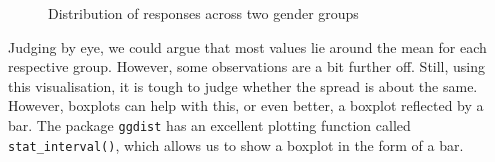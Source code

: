 \documentclass[
  letterpaper,
]{krantz}
\makeatletter
\newenvironment{Shaded}{\begin{snugshade}}{\end{snugshade}}
\newcommand{\AttributeTok}[1]{\textcolor[rgb]{0.40,0.45,0.13}{#1}}
\newcommand{\DecValTok}[1]{\textcolor[rgb]{0.68,0.00,0.00}{#1}}
\newcommand{\FloatTok}[1]{\textcolor[rgb]{0.68,0.00,0.00}{#1}}
\newcommand{\FunctionTok}[1]{\textcolor[rgb]{0.28,0.35,0.67}{#1}}
\newcommand{\NormalTok}[1]{\textcolor[rgb]{0.00,0.23,0.31}{#1}}
\newcommand{\SpecialCharTok}[1]{\textcolor[rgb]{0.37,0.37,0.37}{#1}}
\newcommand{\StringTok}[1]{\textcolor[rgb]{0.13,0.47,0.30}{#1}}
\newenvironment{kframe}{%
\medskip{}
\setlength{\fboxsep}{.8em}
 \def\at@end@of@kframe{}%
 \ifinner\ifhmode%
  \def\at@end@of@kframe{\end{minipage}}%
  \begin{minipage}{\columnwidth}%
 \fi\fi%
 \def\FrameCommand##1{\hskip\@totalleftmargin \hskip-\fboxsep
 \colorbox{shadecolor}{##1}\hskip-\fboxsep
     \hskip-\linewidth \hskip-\@totalleftmargin \hskip\columnwidth}%
 \MakeFramed {\advance\hsize-\width
   \@totalleftmargin\z@ \linewidth\hsize
   \@setminipage}}%
 {\par\unskip\endMakeFramed%
 \at@end@of@kframe}
\renewenvironment{Shaded}{\begin{kframe}}{\end{kframe}}
\makeatother
\begin{document}
\begin{Shaded}
\end{Shaded}

\begin{figure}


\caption{\label{fig-homogeneity-variance}Distribution of responses
across two gender groups}

\end{figure}%

Judging by eye, we could argue that most values lie around the mean for
each respective group. However, some observations are a bit further off.
Still, using this visualisation, it is tough to judge whether the spread
is about the same. However, boxplots can help with this, or even better,
a boxplot reflected by a bar. The package \texttt{ggdist} has an
excellent plotting function called \texttt{stat\_interval()}, which
allows us to show a boxplot in the form of a bar.
\end{document}
